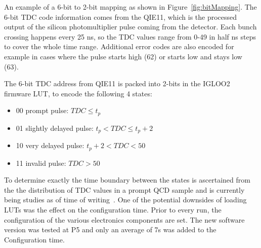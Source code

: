 An example of a 6-bit to 2-bit mapping as shown in Figure~\ref{fig:bitMapping}. The 6-bit TDC code information comes from the QIE11, which is the processed output of the silicon photomultiplier pulse coming from the detector. Each bunch crossing happens every 25 ns, so the TDC values range from 0-49 in half ns steps to cover the whole time range. Additional error codes are also encoded for example in cases where the pulse starts high (62) or starts low and stays low 
(63).

The 6-bit TDC address from QIE11 is packed into 2-bits in the IGLOO2 firmware LUT, to encode the
following 4 states:

\begin{itemize}
  \item 00 prompt pulse:    $ TDC \leq t_{p}$
  \item 01 slightly delayed pulse: $ t_{p} < TDC \leq t_{p} +2$
  \item 10 very delayed pulse:  $ t_{p} +2 < TDC < 50$
  \item 11 invalid pulse: $ TDC > 50$
\end{itemize}

To determine exactly the time boundary between the states is ascertained from the the distribution of TDC values in a prompt QCD sample and is currently being studies as of time of writing~\cite{HBTDCLUT_uHTR}. One of the potential downsides of loading LUTs was the effect on the configuration time. Prior to every run, the configuration of the various electronics components are set. The new software version was tested at P5 and only an average of 7s was added to the Configuration time. 



